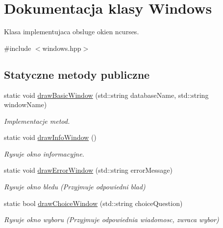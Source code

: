 \hypertarget{class_windows}{}\section{Dokumentacja klasy Windows}
\label{class_windows}


Klasa implementujaca obsluge okien ncurses.  




{\ttfamily \#include $<$windows.\+hpp$>$}

\subsection*{Statyczne metody publiczne}
\begin{DoxyCompactItemize}
\item 
static void \mbox{\hyperlink{class_windows_ac98bb248e4b0ca214f4d20ab656073d4}{draw\+Basic\+Window}} (std\+::string database\+Name, std\+::string window\+Name)
\begin{DoxyCompactList}\small\item\em Implementacje metod. \end{DoxyCompactList}\item 
\mbox{\label{class_windows_ae0e2230490fccfd42a83bd06803f7124}} 
static void \mbox{\hyperlink{class_windows_ae0e2230490fccfd42a83bd06803f7124}{draw\+Info\+Window}} ()
\begin{DoxyCompactList}\small\item\em Rysuje okno informacyjne. \end{DoxyCompactList}\item 
\mbox{\label{class_windows_a9987c59a7d56996e59c4ff124ff5b279}} 
static void \mbox{\hyperlink{class_windows_a9987c59a7d56996e59c4ff124ff5b279}{draw\+Error\+Window}} (std\+::string error\+Message)
\begin{DoxyCompactList}\small\item\em Rysuje okno bledu (Przyjmuje odpowiedni blad) \end{DoxyCompactList}\item 
\mbox{\label{class_windows_a55e5f7592377477c2bbad673ae01b94e}} 
static bool \mbox{\hyperlink{class_windows_a55e5f7592377477c2bbad673ae01b94e}{draw\+Choice\+Window}} (std\+::string choice\+Question)
\begin{DoxyCompactList}\small\item\em Rysuje okno wyboru (Przyjmuje odpowiednia wiadomosc, zwraca wybor) \end{DoxyCompactList}\item 

\end{DoxyCompactItemize}
